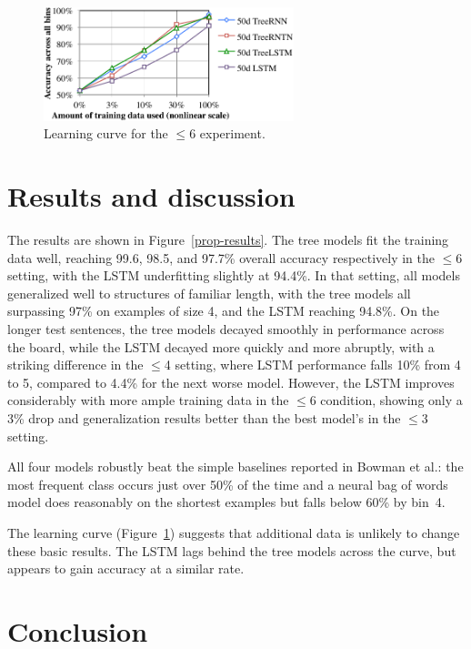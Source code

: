 \begin{figure}[t]
  \centering
      \includegraphics[height=1.3in]{lcc.pdf}
  \caption{Learning curve for the $\le$6 experiment.}
  \label{fig:lc} 
\end{figure}

\section{Results and discussion}\label{sec:discussion}

The results are shown in Figure~\ref{prop-results}. 
The tree models fit the training data well, reaching 99.6, 98.5, and 97.7\% overall accuracy respectively in the $\le$6 setting, with the LSTM underfitting slightly at 94.4\%. 
In that setting, all models generalized well to structures of familiar length, with the tree models all surpassing 97\% on examples of size 4, and the LSTM reaching 94.8\%.
On the longer test sentences, the tree models decayed smoothly in performance across the board, while the LSTM decayed more quickly and more abruptly, with a striking difference in the $\le$4 setting, where LSTM performance falls 10\% from 4 to 5, compared to 4.4\% for the next worse model. However, the LSTM improves considerably with more ample training data in the $\le$6 condition, showing only a 3\% drop and generalization results better than the best model's in the $\le$3 setting.

All four models robustly beat the simple baselines reported in Bowman et al.: the most frequent class occurs just over 50\% of the time and a neural bag of words model does reasonably on the shortest examples but falls below 60\% by bin~4.

The learning curve (Figure~\ref{fig:lc}) suggests that additional data is unlikely to change these basic results. The LSTM lags behind the tree models across the curve, but appears to gain accuracy at a similar rate.

\section{Conclusion}

